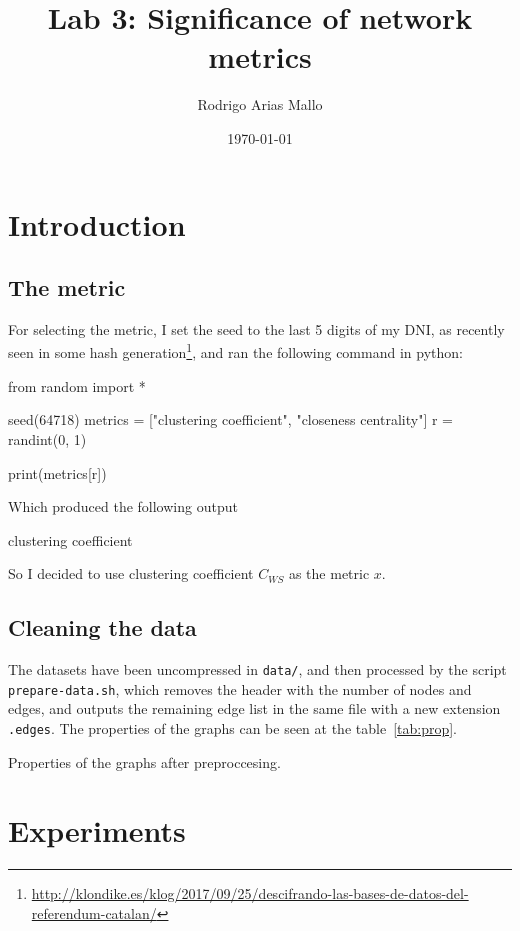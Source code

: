 \documentclass[a4paper]{article}
\title{Lab 3: Significance of network metrics}
\author{Rodrigo Arias Mallo}
\date{\today}
\begin{document}
\maketitle

\section{Introduction}
\subsection{The metric}

For selecting the metric, I set the seed to the last 5 digits of my DNI, as 
recently seen in some hash generation\footnote{	
\url{http://klondike.es/klog/2017/09/25/descifrando-las-bases-de-datos-del-referendum-catalan/}}, 
and ran the following command in python:
%
\begin{pycode}
from random import *

seed(64718)
metrics = ["clustering coefficient", "closeness centrality"]
r = randint(0, 1)

print(metrics[r])
\end{pycode}
%
Which produced the following output
%
\begin{textcode}
clustering coefficient
\end{textcode}
%
So I decided to use clustering coefficient $C_{WS}$ as the metric $x$.


\subsection{Cleaning the data}

The datasets have been uncompressed in \texttt{data/}, and then processed by the 
script \texttt{prepare-data.sh}, which removes the header with the number of 
nodes and edges, and outputs the remaining edge list in the same file with a new 
extension \texttt{.edges}. The properties of the graphs can be seen at the 
table~\ref{tab:prop}.

\begin{table}[h]
	\centering
	
	\caption{Properties of the graphs after preproccesing.}
	\label{tab:prop}
\end{table}

\section{Experiments}
\end{document}
